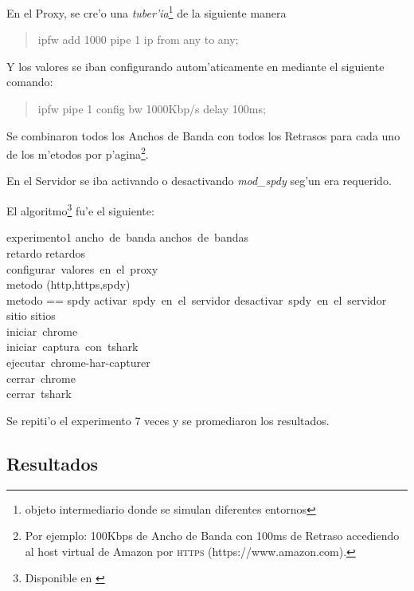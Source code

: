 \documentclass[a4paper,11pt,twocolumn]{article}
\begin{document}
En el Proxy, se cre'o una \emph{tuber'ia}\footnote{objeto intermediario donde se simulan diferentes entornos} de la siguiente manera

\begin{quote}\small
ipfw add 1000 pipe 1 ip from any to any;
\end{quote}

Y los valores se iban configurando autom'aticamente en mediante el siguiente comando:

\begin{quote}\small
ipfw pipe 1 config bw 1000Kbp/s delay 100ms;
\end{quote}

Se combinaron todos los Anchos de Banda con todos los Retrasos para cada uno de los m'etodos por p'agina\footnote{Por ejemplo: 100Kbps de Ancho de Banda con 100ms de Retraso accediendo al host virtual de Amazon por \textsc{https} (https://www.amazon.com).}.

En el Servidor se iba activando o desactivando \emph{mod\_spdy} seg'un era requerido.

El algoritmo\footnote{Disponible en \cite[exp1.sh]{spdy-tests}} fu'e el siguiente:

\begin{pseudocode}{experimento1}{ }
\FOR ancho\ de\ banda \in anchos\ de\ bandas \DO \\
	\BEGIN
	\FOR retardo \in retardos \DO \\
		\BEGIN
			configurar\ valores\ en\ el\ proxy \\
			\FOR metodo \in (http,https,spdy) \DO \\
				\BEGIN
					\IF metodo == spdy
					\THEN
						activar\ spdy\ en\ el\ servidor
					\ELSE
						desactivar\ spdy\ en\ el\ servidor\\
					\FOR sitio \in sitios \DO \\
					\BEGIN
						iniciar\ chrome\\
						iniciar\ captura\ con\ tshark\\
						ejecutar\ chrome-har-capturer\\
						cerrar\ chrome\\
						cerrar\ tshark
					\END
				\END
		\END
	\END
\end{pseudocode}

Se repiti'o el experimento 7 veces y se promediaron los resultados.

\subsection{Resultados}
\end{document}
